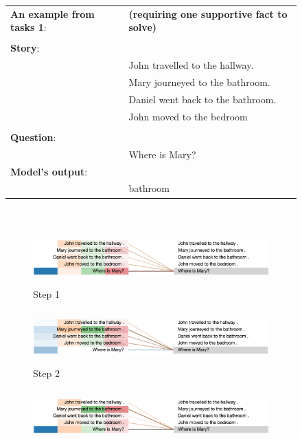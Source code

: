 \begin{figure}[!h]
\label{fig:ex1}
\begin{minipage}{\textwidth}
\fontsize{8}{8}\selectfont
\begin{tabular}{l l}
\textbf{An example from tasks 1}: & \textbf{(requiring one supportive fact to solve)}\\
\\
\textbf{Story}: & \\
& John travelled to the hallway. \\
& Mary journeyed to the bathroom. \\
& Daniel went back to the bathroom. \\
& John moved to the bedroom \\
\\
\textbf{Question}: & \\
& Where is Mary? \\
\textbf{Model's output}: & \\
& bathroom
\end{tabular}
\end{minipage}
\\ \vfill
\vspace{20pt} %
\begin{minipage}{\textwidth}
    \centering
    \begin{subfigure}[t]{\textwidth}
        \centering
        \includegraphics[height=0.8in]{04-part-03/chapter-06/figs_and_tables/figs_attention_babi/e1-step1.png}
        \caption{Step 1}
    \end{subfigure}%
    \hfill \hfill
    \begin{subfigure}[t]{\textwidth}
        \centering
        \includegraphics[height=0.8in]{04-part-03/chapter-06/figs_and_tables/figs_attention_babi/e1-step2}
        \caption{Step 2}
    \end{subfigure}
    \hfill \hfill
    \begin{subfigure}[t]{\textwidth}
        \centering
        \includegraphics[height=0.8in]{04-part-03/chapter-06/figs_and_tables/figs_attention_babi/e1-step3}

\end{subfigure}
\end{minipage}
\end{figure}
